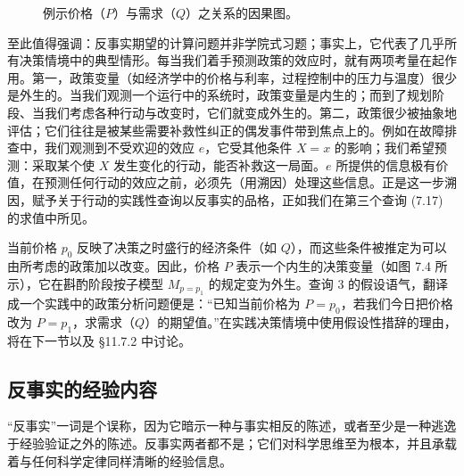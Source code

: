 \begin{figure}[htbp]
\centering
{}
\caption{例示价格（$P$）与需求（$Q$）之关系的因果图。}
\label{fig:7.4}
\end{figure}

至此值得强调：反事实期望的计算问题并非学院式习题；事实上，它代表了几乎所有决策情境中的典型情形。每当我们着手预测政策的效应时，就有两项考量在起作用。第一，政策变量（如经济学中的价格与利率，过程控制中的压力与温度）很少是外生的。当我们观测一个运行中的系统时，政策变量是内生的；而到了规划阶段、当我们考虑各种行动与改变时，它们就变成外生的。第二，政策很少被抽象地评估；它们往往是被某些需要补救性纠正的偶发事件带到焦点上的。例如在故障排查中，我们观测到不受欢迎的效应 $e$，它受其他条件 $X=x$ 的影响；我们希望预测：采取某个使 $X$ 发生变化的行动，能否补救这一局面。$e$ 所提供的信息极有价值，在预测任何行动的效应之前，必须先（用溯因）处理这些信息。正是这一步溯因，赋予关于行动的实践性查询以反事实的品格，正如我们在第三个查询 \textup{(7.17)} 的求值中所见。

当前价格 $p_0$ 反映了决策之时盛行的经济条件（如 $Q$），而这些条件被推定为可以由所考虑的政策加以改变。因此，价格 $P$ 表示一个内生的决策变量（如图 7.4 所示），它在斟酌阶段按子模型 $M_{p=p_1}$ 的规定变为外生。查询 3 的假设语气，翻译成一个实践中的政策分析问题便是：“已知当前价格为 $P=p_0$，若我们今日把价格改为 $P=p_1$，求需求（$Q$）的期望值。”在实践决策情境中使用假设性措辞的理由，将在下一节以及 \S 11.7.2 中讨论。

\subsection{反事实的经验内容}

“反事实”一词是个误称，因为它暗示一种与事实相反的陈述，或者至少是一种逃逸于经验验证之外的陈述。反事实两者都不是；它们对科学思维至为根本，并且承载着与任何科学定律同样清晰的经验信息。

